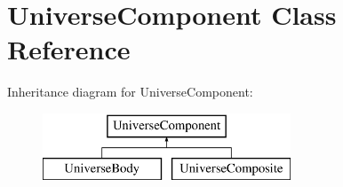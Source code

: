 \hypertarget{classUniverseComponent}{}\section{Universe\+Component Class Reference}
\label{classUniverseComponent}
Inheritance diagram for Universe\+Component\+:\begin{figure}[H]
\begin{center}
\leavevmode
\includegraphics[height=2.000000cm]{classUniverseComponent}
\end{center}
\end{figure}
